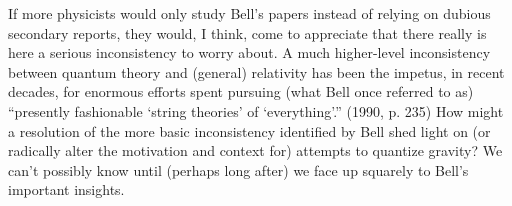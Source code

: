 \documentclass[aps,prc,twocolumn]{revtex4}
\begin{document}
If more physicists would only study Bell's papers instead of relying 
on dubious secondary reports, they would, I think, come to appreciate
that there really is here a serious inconsistency to worry about.  A
much higher-level inconsistency between quantum theory 
and (general) relativity
has been the impetus, in recent decades, for enormous efforts spent
pursuing (what Bell once referred to as) ``presently fashionable
`string theories' of `everything'.''  (1990, p. 235)  How might
a resolution of the more basic inconsistency identified by Bell shed
light on (or radically alter the motivation and context for) attempts 
to quantize gravity?  We can't possibly know until (perhaps long
after) we face up squarely to Bell's important insights.
\end{document}

